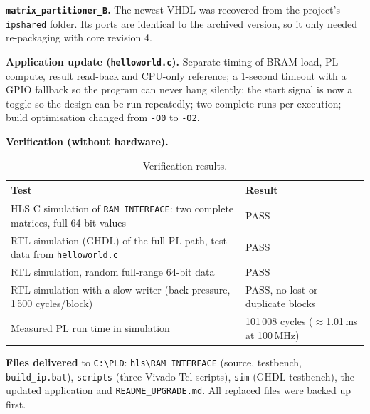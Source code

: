 \documentclass[11pt,a4paper]{article}
\newcommand{\code}[1]{\texttt{#1}}
\begin{document}
\textbf{\code{matrix\_partitioner\_B}.} The newest VHDL was recovered from the project's \code{ipshared} folder. Its ports are identical to the archived version, so it only needed re-packaging with core revision 4.

\textbf{Application update (\code{helloworld.c}).} Separate timing of BRAM load, PL compute, result read-back and CPU-only reference; a 1-second timeout with a GPIO fallback so the program can never hang silently; the start signal is now a toggle so the design can be run repeatedly; two complete runs per execution; build optimisation changed from \code{-O0} to \code{-O2}.

\textbf{Verification (without hardware).}
\begin{table}[H]
\centering
\begin{tabularx}{\textwidth}{@{}Yl@{}}
\toprule
\textbf{Test} & \textbf{Result} \\
\midrule
HLS C simulation of \code{RAM\_INTERFACE}: two complete matrices, full 64-bit values & PASS \\
RTL simulation (GHDL) of the full PL path, test data from \code{helloworld.c} & PASS \\
RTL simulation, random full-range 64-bit data & PASS \\
RTL simulation with a slow writer (back-pressure, 1\,500 cycles/block) & PASS, no lost or duplicate blocks \\
Measured PL run time in simulation & 101\,008 cycles ($\approx$1.01\,ms at 100\,MHz) \\
\bottomrule
\end{tabularx}
\caption{Verification results.}
\end{table}

\textbf{Files delivered} to \code{C:\textbackslash PLD}: \code{hls\textbackslash RAM\_INTERFACE} (source, testbench, \code{build\_ip.bat}), \code{scripts} (three Vivado Tcl scripts), \code{sim} (GHDL testbench), the updated application and \code{README\_UPGRADE.md}. All replaced files were backed up first.

\end{document}
